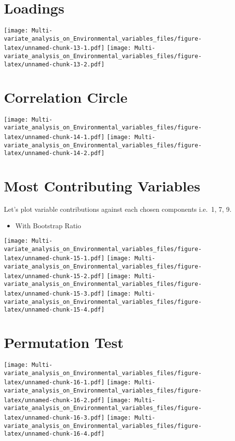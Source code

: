 \documentclass[]{book}
\providecommand{\tightlist}{%
  \setlength{\itemsep}{0pt}\setlength{\parskip}{0pt}}
\begin{document}
\hypertarget{loadings}{%
\section{Loadings}\label{loadings}}

\texttt{[image: Multi-variate\_analysis\_on\_Environmental\_variables\_files/figure-latex/unnamed-chunk-13-1.pdf]}
\texttt{[image: Multi-variate\_analysis\_on\_Environmental\_variables\_files/figure-latex/unnamed-chunk-13-2.pdf]}

\hypertarget{correlation-circle}{%
\section{Correlation Circle}\label{correlation-circle}}

\texttt{[image: Multi-variate\_analysis\_on\_Environmental\_variables\_files/figure-latex/unnamed-chunk-14-1.pdf]}
\texttt{[image: Multi-variate\_analysis\_on\_Environmental\_variables\_files/figure-latex/unnamed-chunk-14-2.pdf]}

\hypertarget{most-contributing-variables}{%
\section{Most Contributing
Variables}\label{most-contributing-variables}}

Let's plot variable contributions against each chosen components i.e.~1,
7, 9.

\begin{itemize}
\tightlist
\item
  With Bootstrap Ratio
\end{itemize}

\texttt{[image: Multi-variate\_analysis\_on\_Environmental\_variables\_files/figure-latex/unnamed-chunk-15-1.pdf]}
\texttt{[image: Multi-variate\_analysis\_on\_Environmental\_variables\_files/figure-latex/unnamed-chunk-15-2.pdf]}
\texttt{[image: Multi-variate\_analysis\_on\_Environmental\_variables\_files/figure-latex/unnamed-chunk-15-3.pdf]}
\texttt{[image: Multi-variate\_analysis\_on\_Environmental\_variables\_files/figure-latex/unnamed-chunk-15-4.pdf]}

\hypertarget{permutation-test}{%
\section{Permutation Test}\label{permutation-test}}

\texttt{[image: Multi-variate\_analysis\_on\_Environmental\_variables\_files/figure-latex/unnamed-chunk-16-1.pdf]}
\texttt{[image: Multi-variate\_analysis\_on\_Environmental\_variables\_files/figure-latex/unnamed-chunk-16-2.pdf]}
\texttt{[image: Multi-variate\_analysis\_on\_Environmental\_variables\_files/figure-latex/unnamed-chunk-16-3.pdf]}
\texttt{[image: Multi-variate\_analysis\_on\_Environmental\_variables\_files/figure-latex/unnamed-chunk-16-4.pdf]}
\end{document}
